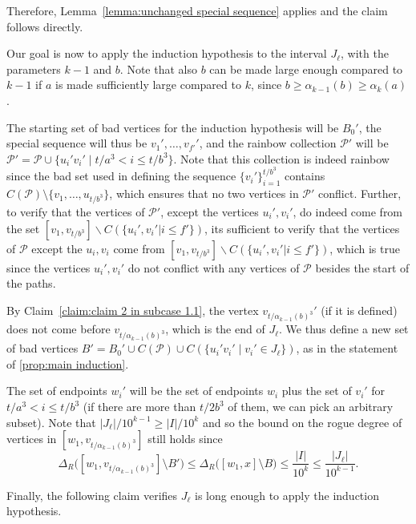 \documentclass[a4paper,11pt]{article}
\makeatletter
\renewenvironment{proof}[1][\proofname] {\par\pushQED{\qed}\normalfont\topsep6\p@\@plus6\p@\relax\trivlist\item[\hskip\labelsep\bfseries#1\@addpunct{.}]\ignorespaces}{\popQED\endtrivlist\@endpefalse}
\theoremstyle{definition}
\def\cP{\mathcal{P}}
\makeatother
\begin{document}
\begin{proof}
\begin{proof}
Therefore, Lemma~\ref{lemma:unchanged special sequence} applies and the claim follows directly.
\end{proof}

Our goal is now to apply the induction hypothesis to the interval $J_\ell$, with the parameters $k-1$ and $b$. Note that also $b$ can be made large enough compared to $k-1$ if $a$ is made sufficiently large compared to $k$, since $b\geq \alpha_{k-1}(b)\geq \alpha_k(a)$.

The starting set of bad vertices for the induction hypothesis will be $B_0'$, the special sequence will thus be $v_1', \dots, v_{f'}'$, and the rainbow collection $\cP'$ will be $\cP'=\cP\cup \{u_i'v_i'\mid t/a^3< i\leq t/b^3\}$. Note that this collection is indeed rainbow since the bad set used in defining the sequence $\{v_i'\}_{i=1}^{t/b^3}$ contains $C(\cP)\setminus \{v_1, \dots, u_{t/b^3}\}$, which ensures that no two vertices in $\cP'$ conflict. Further, to verify that the vertices of $\cP'$, except the vertices $u_i', v_i'$, do indeed come from the set $[v_1, v_{t/b^3}]\backslash C(\{u_i', v_i'|i\leq f'\})$, its sufficient to verify that the vertices of $\cP$ except the $u_i, v_i$ come from $[v_1, v_{t/b^3}]\backslash C(\{u_i', v_i'|i\leq f'\})$, which is true since the vertices $u_i', v_i'$ do not conflict with any vertices of $\cP$ besides the start of the paths.

By Claim~\ref{claim:claim 2 in subcase 1.1}, the vertex $v_{t/\alpha_{k-1}(b)^3}'$ (if it is defined) does not come before $v_{t/\alpha_{k-1}(b)^3}$, which is the end of $J_\ell$. 
We thus define a new set of bad vertices $B'=B_0'\cup C(\cP)\cup C(\{u_{i}'v_i'\mid v_i'\in J_\ell\})$, as in the statement of \cref{prop:main induction}.

The set of endpoints $w_i'$ will be the set of endpoints $w_i$ plus the set of $v_i'$ for $t/a^3< i\leq t/b^3$ (if there are more than $t/2b^3$ of them, we can pick an arbitrary subset). Note that $|J_\ell|/10^{k-1}\geq |I|/10^k$ and so the bound on the rogue degree of vertices in $[w_1, v_{t/\alpha_{k-1}(b)^3}]$ still holds since
\[\Delta_R\big([w_1, v_{t/\alpha_{k-1}(b)^3}]\setminus B'\big)\leq \Delta_R\big([w_1, x]\setminus B\big)\leq \frac{|I|}{10^k}\leq \frac{|J_\ell|}{10^{k-1}}.\]

Finally, the following claim verifies $J_\ell$ is long enough to apply the induction hypothesis.


\end{proof}
\end{document}
